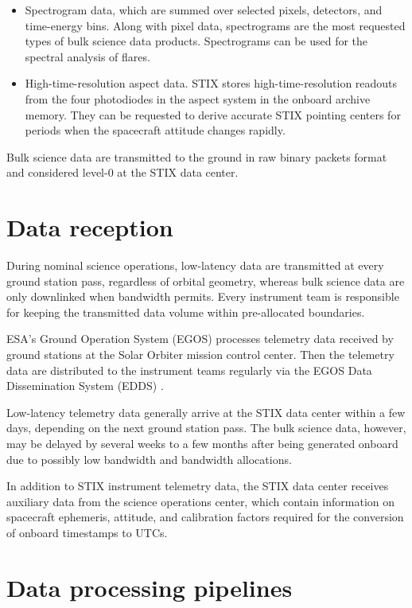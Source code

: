 \documentclass[referee]{preaa} %
\begin{document}
\begin{itemize}
\item Spectrogram data, which are summed over selected pixels, detectors, and time-energy bins. Along with pixel data, spectrograms are the most requested types of bulk science data products. Spectrograms can be used for the spectral analysis of flares.

\item High-time-resolution aspect data.  STIX stores high-time-resolution readouts from the four photodiodes in the aspect system in the onboard archive memory. They can be requested to derive accurate STIX pointing centers for periods when the spacecraft attitude changes rapidly.
\end{itemize}

Bulk science data are transmitted to the ground in raw binary packets format and considered level-0 at the STIX data center.  

\section{Data reception}
During nominal science operations, low-latency data are transmitted at every ground station pass, regardless of orbital geometry, whereas bulk science data are only downlinked when bandwidth permits. Every instrument team is responsible for keeping the transmitted data volume within pre-allocated boundaries.

ESA's Ground Operation System (EGOS) processes telemetry data received by ground stations at the Solar Orbiter mission control center. Then the telemetry data are distributed to the instrument teams regularly via the EGOS Data Dissemination System (EDDS) \citep{EDDS}. 

Low-latency telemetry data generally arrive at the STIX data center within a few days, depending on the next ground station pass. The bulk science data, however, may be delayed by several weeks to a few months after being generated onboard due to possibly low bandwidth and bandwidth allocations.

In addition to STIX instrument telemetry data, the STIX data center receives auxiliary data \citep{spice1996,spice2018} from the science operations center, which contain information on spacecraft ephemeris, attitude, and calibration factors required for the conversion of onboard timestamps to UTCs. 

\section{Data processing pipelines}
\end{document}
